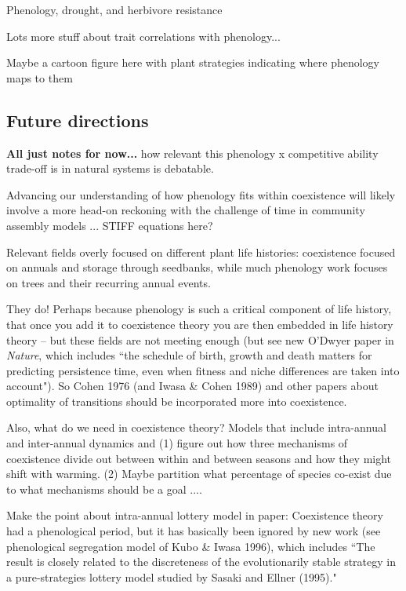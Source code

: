 \documentclass[11pt]{article}
\begin{document}
Phenology, drought, and herbivore resistance

Lots more stuff about trait correlations with phenology...

Maybe a cartoon figure here with plant strategies indicating where phenology maps to them

\subsection*{Future directions}

{\bf All just notes for now...}
 how relevant this phenology x competitive ability  trade-off is in natural systems is debatable. 
 
 Advancing our understanding of how phenology fits within coexistence will likely involve a more head-on reckoning with the challenge of time in community assembly models ... STIFF equations here? 


Relevant fields overly focused on different plant life histories: coexistence focused on annuals and storage through seedbanks, while much phenology work focuses on trees and their recurring annual events. 

They do! Perhaps because phenology is such a critical component of life history, that once you add it to coexistence theory you are then embedded in life history theory -- but these fields are not meeting enough (but see new O'Dwyer paper in \emph{Nature}, which includes ``the schedule of birth, growth and death matters for predicting persistence time, even when fitness and niche differences are taken into account"). So Cohen 1976 (and Iwasa \& Cohen 1989) and other papers about optimality of transitions should be incorporated more into coexistence. 

Also, what do we need in coexistence theory? Models that include intra-annual and inter-annual dynamics and (1) figure out how three mechanisms of coexistence divide out between within and between seasons and how they might shift with warming. (2) Maybe partition what percentage of species co-exist due to what mechanisms should be a goal .... 

Make the point about intra-annual lottery model in paper: Coexistence theory had a phenological period, but it has basically been ignored by new work (see phenological segregation model of Kubo \& Iwasa 1996), which includes ``The result is closely related to the discreteness of the evolutionarily stable strategy in a pure-strategies lottery model studied by Sasaki and Ellner (1995)." 
\end{document}
